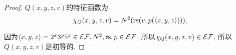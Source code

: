 \begin{proof}
    $Q(x,y,z,v)$的特征函数为
    $$\chi_Q(x,y,z,v)=N^2(\mathrm{rs}(v,p(\langle x,y,z \rangle))),$$
	
    因为$\langle x,y,z \rangle=2^x3^y5^z\in\mathcal{EF},N^2,\mathrm{rs},p\in\mathcal{EF}$,
    所以$\chi_Q(x,y,z,v)\in\mathcal{EF}$, 所以$Q(x,y,z,v)$是初等的.
\end{proof}
